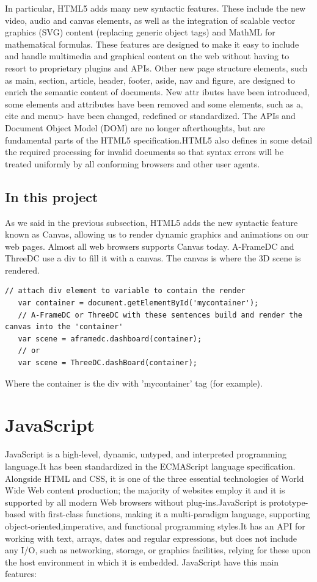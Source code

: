 \documentclass[a4paper, 12pt]{book}
\begin{document}
In particular, HTML5 adds many new syntactic features. These include the new video, audio and canvas elements, as well as the integration of scalable vector graphics (SVG) content (replacing generic object tags) and MathML for mathematical formulas. These features are designed to make it easy to include and handle multimedia and graphical content on the web without having to resort to proprietary plugins and APIs. Other new page structure elements, such as main, section, article, header, footer, aside, nav and figure, are designed to enrich the semantic content of documents. New attr	ibutes have been introduced, some elements and attributes have been removed and some elements, such as a, cite and menu> have been changed, redefined or standardized. The APIs and Document Object Model (DOM) are no longer afterthoughts, but are fundamental parts of the HTML5 specification.HTML5 also defines in some detail the required processing for invalid documents so that syntax errors will be treated uniformly by all conforming browsers and other user agents.
\subsection{In this project}
\label{sec:html5itp}
As we said in the previous subsection, HTML5 adds the new syntactic feature known as Canvas, allowing us to render dynamic graphics and animations on our web pages. Almost all web browsers supports Canvas today.
A-FrameDC and ThreeDC use a div to fill it with a canvas. The canvas is where the 3D scene is rendered.
\lstset{language=Java, breaklines=true, basicstyle=\footnotesize}
\begin{lstlisting}[frame=single]
   // attach div element to variable to contain the render
   var container = document.getElementById('mycontainer');
   // A-FrameDC or ThreeDC with these sentences build and render the canvas into the 'container'
   var scene = aframedc.dashboard(container);
   // or
   var scene = ThreeDC.dashBoard(container);
\end{lstlisting}
Where the container is the div with 'mycontainer' tag (for example).

\section{JavaScript}
\label{sec:js}
JavaScript is a high-level, dynamic, untyped, and interpreted programming language.It has been standardized in the ECMAScript language specification. Alongside HTML and CSS, it is one of the three essential technologies of World Wide Web content production; the majority of websites employ it and it is supported by all modern Web browsers without plug-ins.JavaScript is prototype-based with first-class functions, making it a multi-paradigm language, supporting object-oriented,imperative, and functional programming styles.It has an API for working with text, arrays, dates and regular expressions, but does not include any I/O, such as networking, storage, or graphics facilities, relying for these upon the host environment in which it is embedded. JavaScript have this main features:
\end{document}
